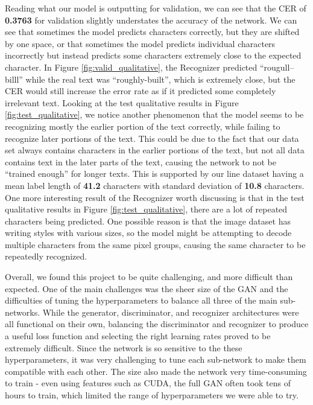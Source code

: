 \documentclass{article} %
\begin{document}
Reading what our model is outputting for validation, we can see that the CER of \textbf{0.3763} for validation slightly understates the accuracy of the network. We can see that sometimes the model predicts characters correctly, but they are shifted by one space, or that sometimes the model predicts individual characters incorrectly but instead predicts some characters extremely close to the expected character. In Figure \ref{fig:valid_qualitative}, the Recognizer predicted ``rougull--billl'' while the real text was ``roughly-built'', which is extremely close, but the CER would still increase the error rate as if it predicted some completely irrelevant text. Looking at the test qualitative results in Figure \ref{fig:test_qualitative}, we notice another phenomenon that the model seems to be recognizing mostly the earlier portion of the text correctly, while failing to recognize later portions of the text. This could be due to the fact that our data set always contains characters in the earlier portions of the text, but not all data contains text in the later parts of the text, causing the network to not be ``trained enough'' for longer texts. This is supported by our line dataset having a mean label length of \textbf{41.2} characters with standard deviation of \textbf{10.8} characters. One more interesting result of the Recognizer worth discussing is that in the test qualitative results in Figure \ref{fig:test_qualitative}, there are a lot of repeated characters being predicted. One possible reason is that the image dataset has writing styles with various sizes, so the model might be attempting to decode multiple characters from the same pixel groups, causing the same character to be repeatedly recognized.

Overall, we found this project to be quite challenging, and more difficult than expected. One of the main challenges was the sheer size of the GAN and the difficulties of tuning the hyperparameters to balance all three of the main sub-networks. While the generator, discriminator, and recognizer architectures were all functional on their own, balancing the discriminator and recognizer to produce a useful loss function and selecting the right learning rates proved to be extremely difficult. Since the network is so sensitive to the these hyperparameters, it was very challenging to tune each sub-network to make them compatible with each other. The size also made the network very time-consuming to train - even using features such as CUDA, the full GAN often took tens of hours to train, which limited the range of hyperparameters we were able to try.
\end{document}
